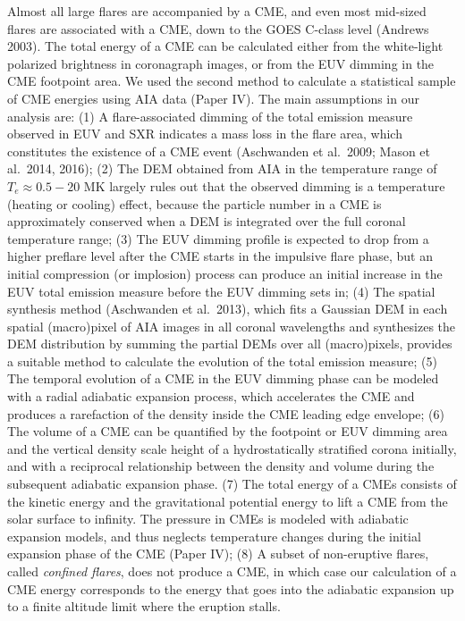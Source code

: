 \documentclass[10pt,preprint]{aastex}  %
\begin{document}
Almost all large flares are accompanied by a CME, and even most
mid-sized flares are associated with a CME, down to the GOES 
C-class level (Andrews 2003).
The total energy of a CME can be calculated either from the
white-light polarized brightness in coronagraph images, or from
the EUV dimming in the CME footpoint area. We used the second
method to calculate a statistical sample of CME energies using
AIA data (Paper IV). The main assumptions in our analysis are:
(1) A flare-associated dimming of the total emission measure 
observed in EUV and SXR indicates a mass loss in the
flare area, which constitutes the existence of a CME event
(Aschwanden et al.~2009; Mason et al.~2014, 2016);
(2) The DEM obtained from AIA in the temperature range of
$T_e \approx 0.5-20$ MK largely rules out that the observed
dimming is a temperature (heating or cooling) effect, because
the particle number in a CME is approximately conserved when a 
DEM is integrated over the full coronal temperature range;
(3) The EUV dimming profile is expected to drop from a higher
preflare level after the CME starts in the impulsive flare
phase, but an initial compression (or implosion) process
can produce an initial increase in the EUV total emission
measure before the EUV dimming sets in;
(4) The spatial synthesis method (Aschwanden et al.~2013),
which fits a Gaussian DEM in each spatial (macro)pixel
of AIA images in all coronal wavelengths and synthesizes the
DEM distribution by summing the partial DEMs over all 
(macro)pixels, provides a suitable method to calculate the
evolution of the total emission measure;
(5) The temporal evolution of a CME in the EUV dimming phase
can be modeled with a radial adiabatic expansion process,
which accelerates the CME and produces a rarefaction of the
density inside the CME leading edge envelope;
(6) The volume of a CME can be quantified by the footpoint
or EUV dimming area and the vertical density scale height 
of a hydrostatically stratified corona initially, and with a
reciprocal relationship between the density and volume during
the subsequent adiabatic expansion phase.  
(7) The total energy of a CMEs consists of the kinetic energy
and the gravitational potential energy to lift a CME from the
solar surface to infinity. The pressure in CMEs is modeled
with adiabatic expansion models, and thus neglects temperature 
changes during the initial expansion phase of the CME (Paper IV);
(8) A subset of non-eruptive flares, called {\sl confined
flares}, does not produce a CME, in which case our calculation
of a CME energy corresponds to the energy that goes into the 
adiabatic expansion up to a finite altitude limit where the
eruption stalls. 
\end{document}
